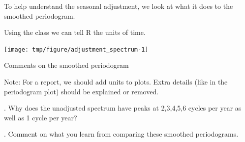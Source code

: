 \begin{frame}[fragile]


\vspace{-2mm}

\bi

\item To help understand the seasonal adjustment, we look at what it does to the smoothed periodogram.

\item Using the  class we can tell R the units of time.

\ei

\vspace{-1mm}

\begin{knitrout}\small
{}\color{fgcolor}\begin{kframe}
\begin{alltt}
 \hlkwb{<-} \hlstd{=}\hlstd{,}\hlstd{=}\hlstd{)}
 \hlkwb{<-} \hlstd{=}\hlstd{,}\hlstd{=}\hlstd{)}
\hlstd{(}\hlstd{=}\hlstd{(}\hlstd{,}\hlstd{,}\hlstd{),}
  \hlstd{=}\hlstd{)}
\end{alltt}
\end{kframe}
\end{knitrout}

\vspace{-3mm}

\begin{knitrout}\small
{}\color{fgcolor}

{\centering \texttt{[image: tmp/figure/adjustment\_spectrum-1]} 

}


\end{knitrout}


\end{frame}

\begin{frame}{Comments on the smoothed periodogram}

\bi
\item Note: For a report, we should add units to plots. Extra details (like  in the periodogram plot) should be explained or removed.
\ei

\vspace{1mm}

\myquestion. Why does the unadjusted spectrum have peaks at 2,3,4,5,6 cycles per year as well as 1 cycle per year?



\myquestion. Comment on what you learn from comparing these smoothed periodograms.


\end{frame}


